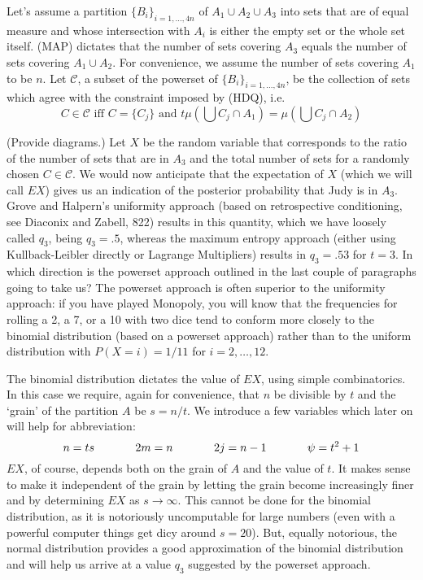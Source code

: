 \documentclass[11pt]{article}
\newcommand{\qnull}[1]{`#1'}
\begin{document}
Let's assume a partition $\{B_{i}\}_{i=1,{\ldots},4n}$ of
$A_{1}\cup{}A_{2}\cup{}A_{3}$ into sets that are of equal measure and
whose intersection with $A_{i}$ is either the empty set or the whole
set itself. (MAP) dictates that the number of sets covering $A_{3}$
equals the number of sets covering $A_{1}\cup{}A_{2}$. For
convenience, we assume the number of sets covering $A_{1}$ to be $n$.
Let $\mathcal{C}$, a subset of the powerset of
$\{B_{i}\}_{i=1,{\ldots},4n}$, be the collection of sets which agree
with the constraint imposed by (HDQ), i.e.\
\begin{displaymath}
  C\in\mathcal{C}\mbox{ iff }C=\{C_{j}\}\mbox{ and }t\mu\left(\bigcup{}C_{j}\cap{}A_{1}\right)=\mu\left(\bigcup{}C_{j}\cap{}A_{2}\right)
\end{displaymath}

(Provide diagrams.) Let $X$ be the random variable that corresponds to
the ratio of the number of sets that are in $A_{3}$ and the total
number of sets for a randomly chosen $C\in\mathcal{C}$. We would now
anticipate that the expectation of $X$ (which we will call $EX$) gives
us an indication of the posterior probability that Judy is in $A_{3}$.
Grove and Halpern's uniformity approach (based on retrospective
conditioning, see Diaconix and Zabell, 822) results in this quantity,
which we have loosely called $q_{3}$, being $q_{3}=.5$, whereas the
maximum entropy approach (either using Kullback-Leibler directly or
Lagrange Multipliers) results in $q_{3}=.53$ for $t=3$. In which
direction is the powerset approach outlined in the last couple of
paragraphs going to take us? The powerset approach is often superior
to the uniformity approach: if you have played Monopoly, you will
know that the frequencies for rolling a 2, a 7, or a 10 with two dice
tend to conform more closely to the binomial distribution (based on a
powerset approach) rather than to the uniform distribution with
$P(X=i)=1/11$ for $i=2,{\ldots},12$.

The binomial distribution dictates the value of $EX$, using simple
combinatorics. In this case we require, again for convenience, that
$n$ be divisible by $t$ and the \qnull{grain} of the partition $A$ be
$s=n/t$. We introduce a few variables which later on will help for
abbreviation:
\begin{displaymath}
n=ts\hspace{.5in}
2m=n\hspace{.5in}
2j=n-1\hspace{.5in}
\psi=t^{2}+1
\end{displaymath}
$EX$, of course, depends both on the grain of $A$ and the value of
$t$. It makes sense to make it independent of the grain by letting the
grain become increasingly finer and by determining $EX$ as
$s\rightarrow\infty$. This cannot be done for the binomial
distribution, as it is notoriously uncomputable for large numbers
(even with a powerful computer things get dicy around $s=20$). But,
equally notorious, the normal distribution provides a good
approximation of the binomial distribution and will help us arrive at
a value $q_{3}$ suggested by the powerset approach.
\end{document}
